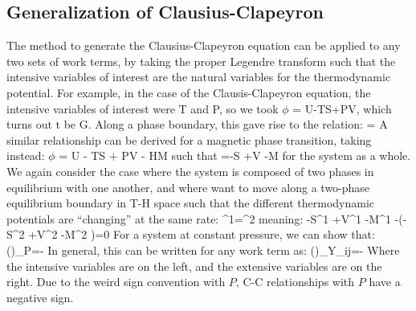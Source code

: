 \documentclass[12pt]{article}
\begin{document}
\subsection{Generalization of Clausius-Clapeyron}
The method to generate the Clausius-Clapeyron equation can be applied to any two sets of work terms, by taking the proper Legendre transform such
that the intensive variables of interest are the natural variables for the thermodynamic potential. For example, in the case of the Clausis-Clapeyron
equation, the intensive variables of interest were T and P, so we took $\phi $ = U-TS+PV, which turns out t be G. Along a phase boundary, this gave rise to the relation:
\eqs
{}=
\eqe
A similar relationship can be derived for a magnetic phase transition, taking
instead: $\phi $ = U - TS + PV - HM such that
\eqs {}=-S +V -M \eqe
for the system as a whole. We again consider the case where the system is composed of two phases in equilibrium with one another, and where want to move along a two-phase equilibrium boundary in T-H space such that the different thermodynamic potentials are ``changing'' at the same rate:
\eqs{}^1=^2\eqe
meaning:
\eqs
-S^1 +V^1 -M^1 -\left(-S^2 +V^2 -M^2 \right)=0
\eqe
For a system at constant pressure, we
can show that:
\eqs\left(\right)_P=-\eqe
In general, this can be written for any work term as:
\eqs\left(\right)_{Y_{i\neq j}}=-\eqe
Where the intensive variables are on the left, and the extensive variables are on the right. Due to the weird sign convention with $P$, C-C relationships with $P$ have a negative sign.
\end{document}
